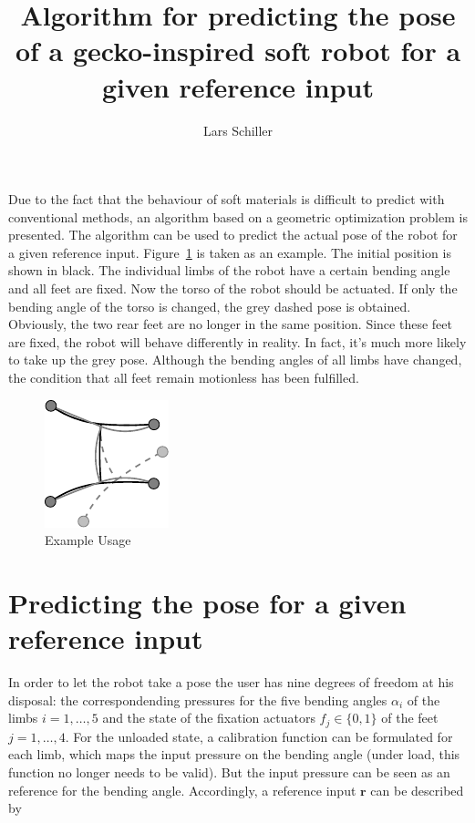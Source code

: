 \documentclass[10pt,a4paper]{article}
\author{Lars Schiller}
\title{Algorithm for predicting the pose of a gecko-inspired soft robot for a given reference input}
\begin{document}
\maketitle

Due to the fact that the behaviour of soft materials is difficult to predict with conventional methods, an algorithm based on a geometric optimization problem is presented.
The algorithm can be used to predict the actual pose of the robot for a given reference input.
Figure~\ref{fig:example} is taken as an example. The initial position is shown in black. 
The individual limbs of the robot have a certain bending angle and all feet are fixed.
Now the torso of the robot should be actuated. 
If only the bending angle of the torso is changed, the grey dashed pose is obtained. 
Obviously, the two rear feet are no longer in the same position. 
Since these feet are fixed, the robot will behave differently in reality. 
In fact, it's much more likely to take up the grey pose. 
Although the bending angles of all limbs have changed, the condition that all feet remain motionless has been fulfilled.

\begin{figure}[h]
\centering\includegraphics[scale=1]{../Pics/intro/intro.pdf}
\caption{Example Usage}
\label{fig:example}
\end{figure}


\section{Predicting the pose for a given reference input}
In order to let the robot take a pose
the user has nine degrees of freedom at his disposal: 
the correspondending pressures for the five bending angles $\alpha_i$ of the limbs $i=1,\dots,5$ and the state of the fixation actuators $f_j \in \{0,1\}$ of the feet $j=1,\dots,4$.
For the unloaded state, a calibration function can be formulated for each limb, which maps the input pressure on the bending angle (under load, this function no longer needs to be valid).
But the input pressure can be seen as an reference for the bending angle.
Accordingly, a reference input $\bm{r}$ can be described by
\end{document}
